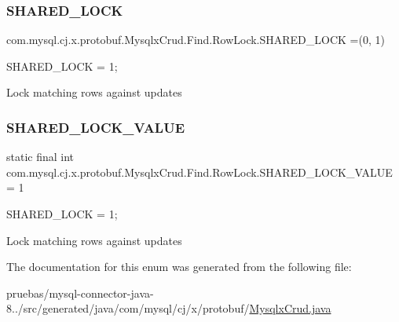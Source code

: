 \subsubsection{\texorpdfstring{S\+H\+A\+R\+E\+D\+\_\+\+L\+O\+CK}{SHARED\_LOCK}}
{\footnotesize\ttfamily com.\+mysql.\+cj.\+x.\+protobuf.\+Mysqlx\+Crud.\+Find.\+Row\+Lock.\+S\+H\+A\+R\+E\+D\+\_\+\+L\+O\+CK =(0, 1)}

{\ttfamily S\+H\+A\+R\+E\+D\+\_\+\+L\+O\+CK = 1;}


\begin{DoxyPre}
Lock matching rows against updates
\end{DoxyPre}
 \mbox{\label{enumcom_1_1mysql_1_1cj_1_1x_1_1protobuf_1_1_mysqlx_crud_1_1_find_1_1_row_lock_a9b593ba176e2c6d30e800321555455ca}} 
\subsubsection{\texorpdfstring{S\+H\+A\+R\+E\+D\+\_\+\+L\+O\+C\+K\+\_\+\+V\+A\+L\+UE}{SHARED\_LOCK\_VALUE}}
{\footnotesize\ttfamily  static  final int com.\+mysql.\+cj.\+x.\+protobuf.\+Mysqlx\+Crud.\+Find.\+Row\+Lock.\+S\+H\+A\+R\+E\+D\+\_\+\+L\+O\+C\+K\+\_\+\+V\+A\+L\+UE = 1\hspace{0.3cm}{\ttfamily [static]}}

{\ttfamily S\+H\+A\+R\+E\+D\+\_\+\+L\+O\+CK = 1;}


\begin{DoxyPre}
Lock matching rows against updates
\end{DoxyPre}
 

The documentation for this enum was generated from the following file\+:\begin{DoxyCompactItemize}
\item 
pruebas/mysql-\/connector-\/java-\/8../src/generated/java/com/mysql/cj/x/protobuf/\mbox{\hyperlink{_mysqlx_crud_8java}{Mysqlx\+Crud.\+java}}\end{DoxyCompactItemize}
